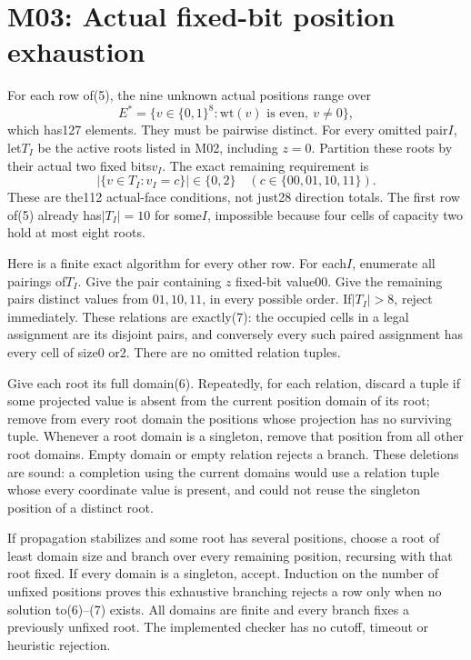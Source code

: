 \documentclass{article}
\begin{document}
\section{M03: Actual fixed-bit position exhaustion}
For each row of(5), the nine unknown actual positions range over
\[
                  E^*=\{v\in\{0,1\}^8:\mathrm{wt}(v)
                                      \text{ is even},\ v\ne0\}, \tag{6}
\]
which has127 elements. They must be pairwise distinct. For every
omitted pair$I$, let$T_I$ be the active roots listed in M02, including
$z=0$. Partition these roots by their actual two fixed bits$v_I$.
The exact remaining requirement is
\[
              |\{v\in T_I:v_I=c\}|\in\{0,2\}
                    \quad(c\in\{00,01,10,11\}).                 \tag{7}
\]
These are the112 actual-face conditions, not just28 direction totals.
The first row of(5) already has$|T_I|=10$ for some$I$, impossible
because four cells of capacity two hold at most eight roots.

Here is a finite exact algorithm for every other row.
For each$I$, enumerate all pairings of$T_I$. Give the pair containing
$z$ fixed-bit value00. Give the remaining pairs distinct values from
$01,10,11$, in every possible order. If$|T_I|>8$, reject immediately.
These relations are exactly(7): the occupied cells in a legal assignment
are its disjoint pairs, and conversely every such paired assignment
has every cell of size0 or2. There are no omitted relation tuples.

Give each root its full domain(6). Repeatedly, for each relation,
discard a tuple if some projected value is absent from the current
position domain of its root; remove from every root domain the positions
whose projection has no surviving tuple. Whenever a root domain is a
singleton, remove that position from all other root domains. Empty
domain or empty relation rejects a branch. These deletions are sound:
a completion using the current domains would use a relation tuple
whose every coordinate value is present, and could not reuse the
singleton position of a distinct root.

If propagation stabilizes and some root has several positions, choose
a root of least domain size and branch over every remaining position,
recursing with that root fixed. If every domain is a singleton, accept.
Induction on the number of unfixed positions proves this exhaustive
branching rejects a row only when no solution to(6)--(7) exists.
All domains are finite and every branch fixes a previously unfixed root.
The implemented checker has no cutoff, timeout or heuristic rejection.
\end{document}
